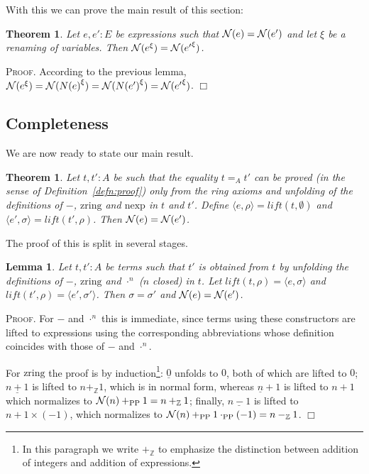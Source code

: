 \documentclass{article}
\newtheorem{theorem}[definition]{Theorem}
\newtheorem{lemma}[definition]{Lemma}
\newenvironment{proof}{\smallskip\textsc{Proof.}}{\hspace*{\fill}$\Box$}
\newcommand{\N}{{\cal N}}
\newcommand{\Z}{{\mathbb Z}}
\newcommand{\zring}{\ensuremath{\mathrm{zring}}}
\newcommand{\nexp}{\ensuremath{\mathrm{nexp}}}
\newcommand{\lift}{\ensuremath{\mathit{lift}}}
\newcommand{\renamevar}[2]{\ensuremath{{#1}^{#2}}}
\newcommand{\plusPP}{\ensuremath{+_{\mathrm{PP}}}}
\newcommand{\multPP}{\ensuremath{\cdot_{\mathrm{PP}}}}
\begin{document}
With this we can prove the main result of this section:

\begin{theorem}\label{substlemma}
Let $e,e':E$ be expressions such that $\N(e)=\N(e')$ and let $\xi$ be
a renaming of variables.  Then $\N(\renamevar e\xi)=\N(\renamevar{e'}\xi)$.
\end{theorem}
\begin{proof}
According to the previous lemma,
$\N(\renamevar e\xi)%
=\N(\renamevar{N(e)}\xi)%
=\N(\renamevar{N(e')}\xi)%
=\N(\renamevar{e'}\xi)$.
\end{proof}

\subsection{Completeness}

We are now ready to state our main result.

\begin{theorem}\label{completeness}
Let $t,t':A$ be such that the equality $t=_A t'$ can be proved (in the
sense of Definition~\ref{defn:proof}) only from the ring axioms and
unfolding of the definitions of $-$, $\zring$ and $\nexp$ in $t$ and
$t'$.  Define $\langle e,\rho\rangle=\lift(t,\emptyset)$ and
$\langle e',\sigma\rangle=\lift(t',\rho)$.  Then $\N(e)=\N(e')$.
\end{theorem}

The proof of this is split in several stages.

\begin{lemma}\label{unfolding}
Let $t,t':A$ be terms such that $t'$ is obtained from $t$ by unfolding
the definitions of $-$, $\zring$ and $\cdot^n$ ($n$ closed) in $t$.
Let $\lift(t,\rho)=\langle e,\sigma\rangle$ and
$\lift(t',\rho)=\langle e',\sigma'\rangle$.  Then $\sigma=\sigma'$ and
$\N(e)=\N(e')$.
\end{lemma}
\begin{proof}
For $-$ and $\cdot^n$ this is immediate,
since terms using these constructors are lifted to expressions using the
corresponding abbreviations whose definition coincides with those of $-$
and $\cdot^n$.

For $\zring$ the proof is by induction\footnote{In this paragraph we
write $+_\Z$ to emphasize the distinction between addition of integers and
addition of expressions.}: $\underline0$ unfolds
to $0$, both of which are lifted to $0$; $\underline{n+1}$ is lifted to
$n+_\Z1$, which is in normal form, whereas $\underline{n}+1$ is lifted
to $n+1$ which normalizes to $\N(n)\plusPP1=n+_\Z1$; finally,
$\underline{n-1}$ is lifted to $n+1\times(-1)$, which normalizes to
$\N(n)\plusPP1\multPP(-1)=n-_\Z1$.
\end{proof}
\end{document}

